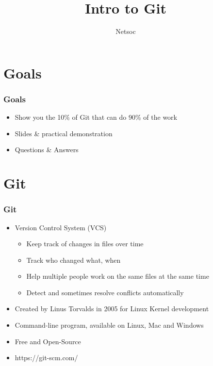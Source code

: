 \documentclass{beamer}
\title{Intro to Git}
\author{Netsoc}
\date{}
\begin{document}
\frame{\titlepage}

\section{Goals}
\begin{frame}
\frametitle{Goals}
\begin{itemize}
\item Show you the 10\% of Git that can do 90\% of the work
\item Slides \& practical demonstration
\item Questions \& Answers
\end{itemize}
\end{frame}

\section{Git}
\begin{frame}
\frametitle{Git}
\begin{itemize}
\item Version Control System (VCS)
\begin{itemize}
\item Keep track of changes in files over time
\item Track who changed what, when
\item Help multiple people work on the same files at the same time
\item Detect and sometimes resolve conflicts automatically
\end{itemize}
\item Created by Linus Torvalds in 2005 for Linux Kernel development
\item Command-line program, available on Linux, Mac and Windows
\item Free and Open-Source
\item https://git-scm.com/
\end{itemize}
\end{frame}
\end{document}

